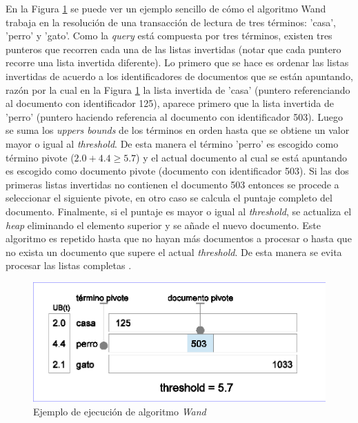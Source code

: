 En la Figura \ref{fig:proceso_wand} se puede ver un ejemplo sencillo de cómo el algoritmo Wand trabaja en la resolución de una transacción de lectura de tres términos: 'casa', 'perro' y 'gato'. Como la \textit{query} está compuesta por tres términos, existen tres punteros que recorren cada una de las listas invertidas (notar que cada puntero recorre una lista invertida diferente). Lo primero que se hace es ordenar las listas invertidas de acuerdo a los identificadores de documentos que se están apuntando, razón por la cual en la Figura \ref{fig:proceso_wand} la lista invertida de 'casa' (puntero referenciando al documento con identificador 125), aparece primero que la lista invertida de 'perro' (puntero haciendo referencia al documento con identificador 503). Luego se suma los \textit{uppers bounds} de los términos en orden hasta que se obtiene un valor mayor o igual al \textit{threshold}. De esta manera el término 'perro' es escogido como término pivote ($2.0 + 4.4 \geq 5.7$) y el actual documento al cual se está apuntando es escogido como documento pivote (documento con identificador 503). Si las dos primeras listas invertidas no contienen el documento 503 entonces se procede a seleccionar el siguiente pivote, en otro caso se calcula el puntaje completo del documento. Finalmente, si el puntaje es mayor o igual al \textit{threshold}, se actualiza el \textit{heap} eliminando el elemento superior y se añade el nuevo documento. 
Este algoritmo es repetido hasta que no hayan más documentos a procesar o hasta que no exista un documento que supere el actual \textit{threshold}. De esta manera se evita procesar las listas completas \citep{Blanco:2010}.

\begin{figure}[!th]
\centering
\includegraphics[scale=.75]{images/proceso_wand.eps}
\caption{Ejemplo de ejecución de algoritmo  \textit{Wand}}
\label{fig:proceso_wand}
\end{figure}

